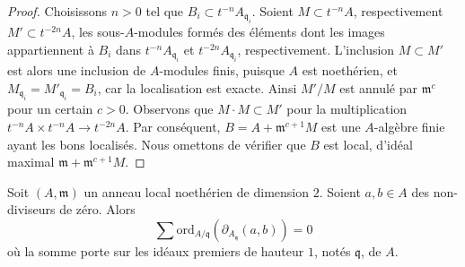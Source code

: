 \begin{proof}
Choisissons $n > 0$ tel que $B_i \subset t^{-n}A_{\mathfrak q_i}$.
Soient $M \subset t^{-n}A$, respectivement $M' \subset t^{-2n}A$, les
sous-$A$-modules formés des éléments dont les images appartiennent à $B_i$
dans $t^{-n}A_{\mathfrak q_i}$ et $t^{-2n}A_{\mathfrak q_i}$, respectivement.
L'inclusion $M \subset M'$ est alors une inclusion de $A$-modules finis, puisque $A$ est noethérien,
et $M_{\mathfrak q_i} = M'_{\mathfrak q_i} = B_i$, car la localisation
est exacte. Ainsi $M'/M$ est annulé par $\mathfrak m^c$ pour un certain
$c > 0$. Observons que $M \cdot M \subset M'$ pour la multiplication
$t^{-n}A \times t^{-n}A \to t^{-2n}A$. Par conséquent,
$B = A + \mathfrak m^{c + 1}M$ est une $A$-algèbre finie ayant les bons
localisés. Nous omettons de vérifier que $B$ est local, d'idéal maximal
$\mathfrak m + \mathfrak m^{c + 1}M$.
\end{proof}

\begin{lemma}
\label{lemma-key-nonzerodivisors}
Soit $(A, \mathfrak m)$ un anneau local noethérien de dimension $2$.
Soient $a, b \in A$ des non-diviseurs de zéro.
Alors
$$
\sum
\text{ord}_{A/\mathfrak q}(\partial_{A_{\mathfrak q}}(a, b))
=
0
$$
où la somme porte sur les idéaux premiers de hauteur $1$, notés $\mathfrak q$, de $A$.
\end{lemma}

